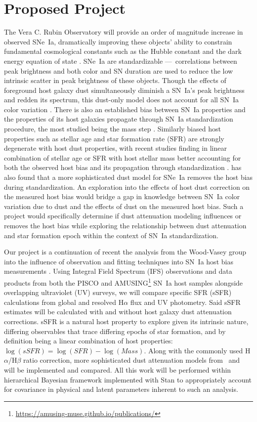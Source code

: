\documentclass[modern]{aastex63}
\begin{document}
\section{Proposed Project}
The Vera C. Rubin Observatory will provide an order of magnitude increase in observed SNe~Ia, dramatically improving these objects' ability to constrain fundamental cosmological constants such as the Hubble constant and the dark energy equation of state \citep{Perlmutter1999}.  
SNe~Ia are standardizable ---~correlations between peak brightness and both color and SN duration are used to reduce the low intrinsic scatter in peak brightness of these objects.  
Though the effects of foreground host galaxy dust simultaneously diminish a SN~Ia's peak brightness and redden its spectrum, this dust-only model does not account for all SN~Ia color variation \citep{Brout2021}.  
There is also an established bias between SN~Ia properties and the properties of its host galaxies propagate through SN~Ia standardization procedure, the most studied being the mass step \citep{Sullivan2010}. 
Similarly biased host properties such as stellar age and star formation rate (SFR) are strongly degenerate with host dust properties, with recent studies finding in linear combination of stellar age or SFR with host stellar mass better accounting for both the observed host bias and its propagation through standardization \citep{Rigault2018,Rose2021}. 
\cite{Brout2021} has also found that a more sophisticated dust model for SNe~Ia removes the host bias during standardization.
An exploration into the effects of host dust correction on the measured host bias would bridge a gap in knowledge between SN~Ia color variation due to dust and the effects of dust on the measured host bias. 
Such a project would specifically determine if dust attenuation modeling influences or removes the host bias while exploring the relationship between dust attenuation and star formation epoch within the context of SN~Ia standardization.

Our project is a continuation of recent the analysis from the Wood-Vasey group into the influence of observation and fitting techniques into SN~Ia host bias measurements \citep{Hand2021}.
Using Integral Field Spectrum (IFS) observations and data products from both the PISCO \citep{Galbany2018} and AMUSING\footnote{\url{https://amusing-muse.github.io/publications/}} SN~Ia host samples alongside overlapping ultraviolet (UV) surveys, we will compare specific SFR (sSFR) calculations from global and resolved H$\alpha$ flux and UV photometry.
Said sSFR estimates will be calculated with and without host galaxy dust attenuation corrections.
sSFR is a natural host property to explore given its intrinsic nature, differing observables that trace differing epochs of star formation, and by definition being a linear combination of host properties: $\log(sSFR) = \log(SFR) - \log(Mass)$.
Along with the commonly used H$\alpha$/H$\beta$ ratio correction, more sophisticated dust attenuation models from~\cite{Salim2018} and~\cite{Narayanan2018} will be implemented and compared.  
All this work will be performed within hierarchical Bayesian framework implemented with Stan to appropriately account for covariance in physical and latent parameters inherent to such an analysis.



\end{document}
